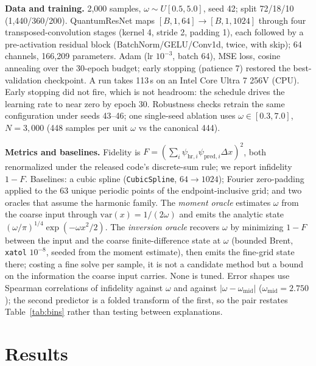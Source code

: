 \documentclass{article}
\begin{document}
\textbf{Data and training.} 2{,}000 samples, $\omega \sim U[0.5, 5.0]$, seed 42;
split 72/18/10 (1{,}440/360/200). QuantumResNet maps $[B, 1, 64] \to [B, 1,
1024]$ through four transposed-convolution stages (kernel 4, stride 2, padding
1), each followed by a pre-activation residual block (BatchNorm/GELU/Conv1d,
twice, with skip); 64 channels, 166{,}209 parameters. Adam
(lr $10^{-3}$, batch 64), MSE loss, cosine annealing over the 30-epoch budget;
early stopping (patience 7) restored the best-validation checkpoint. A run takes
113\,s on an Intel Core Ultra 7 256V (CPU). Early stopping did not fire,
which is not headroom: the schedule drives the learning rate to near zero by
epoch 30. Robustness checks retrain the same configuration under
seeds 43--46; one single-seed ablation uses $\omega \in [0.3, 7.0]$,
$N = 3{,}000$ (448 samples per unit $\omega$ vs the canonical 444).

\textbf{Metrics and baselines.} Fidelity is
$F = (\sum_{i} \psi_{\mathrm{hr},i}\psi_{\mathrm{pred},i}\Delta x)^{2}$, both
renormalized under the released code's discrete-sum rule; we report infidelity
$1 - F$. Baselines: a cubic spline
(\texttt{CubicSpline}, $64 \to 1024$); Fourier zero-padding applied to the 63
unique periodic points of the endpoint-inclusive grid; and two oracles that
assume the harmonic family. The \emph{moment oracle} estimates $\omega$ from the
coarse input through $\mathrm{var}(x) = 1/(2\omega)$ and emits the analytic state
$(\omega/\pi)^{1/4}\exp(-\omega x^{2}/2)$. The \emph{inversion oracle} recovers
$\omega$ by minimizing $1 - F$ between the input and the coarse
finite-difference state at $\omega$ (bounded Brent, \texttt{xatol} $10^{-8}$,
seeded from the moment estimate), then emits the fine-grid state there;
costing a fine solve per sample, it is not a candidate method but a bound on the
information the coarse input carries. None is tuned. Error shapes use
Spearman correlations of infidelity against $\omega$ and against
$|\omega - \omega_{\mathrm{mid}}|$ ($\omega_{\mathrm{mid}} = 2.750$); the second
predictor is a folded transform of the first, so the pair restates
Table~\ref{tab:bins} rather than testing between explanations.

\section{Results}
\label{sec:results}
\end{document}
